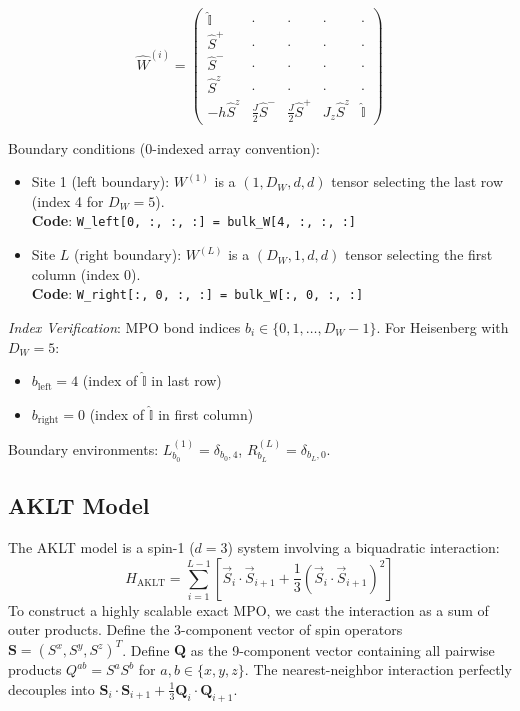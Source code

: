 \documentclass[aps,prb,onecolumn,scriptaddress]{revtex4-2}
\newcommand{\Id}{\mathbb{I}}
\begin{document}
	\begin{equation}
		\hat{W}^{(i)} = \begin{pmatrix}
			\hat{\Id} & \cdot & \cdot & \cdot & \cdot \\
			\hat{S}^+ & \cdot & \cdot & \cdot & \cdot \\
			\hat{S}^- & \cdot & \cdot & \cdot & \cdot \\
			\hat{S}^z & \cdot & \cdot & \cdot & \cdot \\
			-h\hat{S}^z & \frac{J}{2}\hat{S}^- & \frac{J}{2}\hat{S}^+ & J_z \hat{S}^z & \hat{\Id}
		\end{pmatrix}
	\end{equation}
	
	Boundary conditions (0-indexed array convention):
	\begin{itemize}
		\item Site 1 (left boundary): $W^{(1)}$ is a $(1, D_W, d, d)$ tensor selecting the last row (index 4 for $D_W=5$). \\
		\textbf{Code}: \texttt{W\_left[0, :, :, :] = bulk\_W[4, :, :, :]}
		
		\item Site $L$ (right boundary): $W^{(L)}$ is a $(D_W, 1, d, d)$ tensor selecting the first column (index 0). \\
		\textbf{Code}: \texttt{W\_right[:, 0, :, :] = bulk\_W[:, 0, :, :]}
	\end{itemize}
	
	\textit{Index Verification}: MPO bond indices $b_i \in \{0, 1, \dots, D_W-1\}$. For Heisenberg with $D_W=5$:
	\begin{itemize}
		\item $b_{\text{left}} = 4$ (index of $\hat{\Id}$ in last row)
		\item $b_{\text{right}} = 0$ (index of $\hat{\Id}$ in first column)
	\end{itemize}
	Boundary environments: $L^{(1)}_{b_0} = \delta_{b_0, 4}$, $R^{(L)}_{b_L} = \delta_{b_L, 0}$.
	
	\subsection{AKLT Model}
	\label{sec:mpo_aklt}
	The AKLT model is a spin-1 ($d=3$) system involving a biquadratic interaction:
	\begin{equation}
		H_{\text{AKLT}} = \sum_{i=1}^{L-1} \left[ \vec{S}_i \cdot \vec{S}_{i+1} + \frac{1}{3} (\vec{S}_i \cdot \vec{S}_{i+1})^2 \right]
	\end{equation}
	To construct a highly scalable exact MPO, we cast the interaction as a sum of outer products. Define the 3-component vector of spin operators $\mathbf{S} = (S^x, S^y, S^z)^T$. Define $\mathbf{Q}$ as the 9-component vector containing all pairwise products $Q^{ab} = S^a S^b$ for $a,b \in \{x,y,z\}$. The nearest-neighbor interaction perfectly decouples into $\mathbf{S}_i \cdot \mathbf{S}_{i+1} + \frac{1}{3} \mathbf{Q}_i \cdot \mathbf{Q}_{i+1}$.
	
\end{document}
